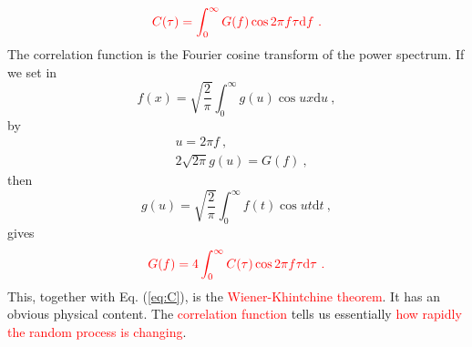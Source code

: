 \documentclass[12pt,a4paper]{article}
\newcommand{\dif}{\mathrm{d}}
\newcounter{theo}[section]\setcounter{theo}{0}
\begin{document}
\begin{equation}
\color{red} C(\tau) = \int_0^\infty G(f) \cos 2\pi f \tau \dif f ~.
\label{eq:C}
\end{equation}
The correlation function is the Fourier cosine transform of the power spectrum. If we set in
\begin{equation}
f(x) = \sqrt{\dfrac{2}{\pi}} \int_0^\infty g(u) \cos u x \dif u ~,
\end{equation}
by
\begin{align}
& u = 2\pi f ~, \\
& 2 \sqrt{2\pi} g(u) = G(f) ~,
\end{align}
then
\begin{equation}
g(u) = \sqrt{\dfrac{2}{\pi}} \int_0^\infty f(t) \cos u t \dif t ~,
\end{equation}
gives
\begin{equation}
\color{red} G(f)  = 4 \int_0^\infty C(\tau) \cos 2\pi f \tau \dif \tau ~.
\label{eq:G}
\end{equation}
This, together with Eq. (\ref{eq:C}),  is the \textcolor{red}{Wiener-Khintchine theorem}. It has an obvious physical content. The \textcolor{red}{correlation function} tells us essentially \textcolor{red}{how rapidly the random process is changing}. 















































\end{document}

